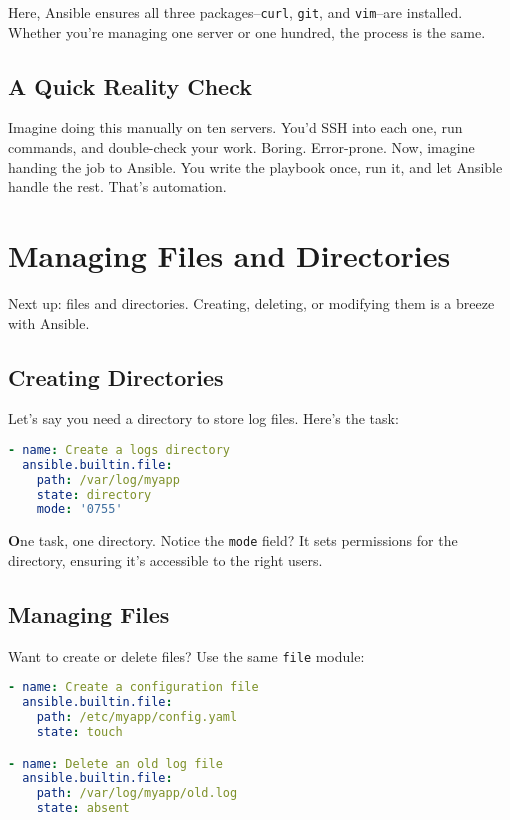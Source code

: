 Here, Ansible ensures all three packages--\texttt{curl}, \texttt{git}, and \texttt{vim}--are installed. Whether you're managing one server or one hundred, the process is the same.

\subsection{A Quick Reality Check}

Imagine doing this manually on ten servers. You'd SSH into each one, run commands, and double-check your work. Boring. Error-prone. Now, imagine handing the job to Ansible. You write the playbook once, run it, and let Ansible handle the rest. That's automation.

\section{Managing Files and Directories}

Next up: files and directories. Creating, deleting, or modifying them is a breeze with Ansible.

\subsection{Creating Directories}

Let's say you need a directory to store log files. Here's the task:
\begin{lstlisting}[language=yaml, caption=Creating a Directory]
- name: Create a logs directory
  ansible.builtin.file:
    path: /var/log/myapp
    state: directory
    mode: '0755'
\end{lstlisting}

\textbf{O}ne task, one directory. Notice the \texttt{mode} field? It sets permissions for the directory, ensuring it's accessible to the right users.

\subsection{Managing Files}

Want to create or delete files? Use the same \texttt{file} module:
\begin{lstlisting}[language=yaml, caption=Creating or Deleting Files]
- name: Create a configuration file
  ansible.builtin.file:
    path: /etc/myapp/config.yaml
    state: touch

- name: Delete an old log file
  ansible.builtin.file:
    path: /var/log/myapp/old.log
    state: absent
\end{lstlisting}


